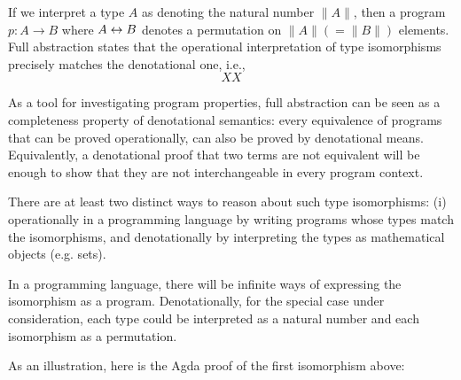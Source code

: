 If we interpret a type $A$ as denoting the natural number $\| A \|$, then a
program $p : A \rightarrow B$ where $A \leftrightarrow B$ denotes a permutation on
$\| A \| (= \| B \|)$ elements. Full abstraction states that the operational
interpretation of type isomorphisms precisely matches the denotational one,
i.e.,
\[
XX
\]

As a tool for investigating program properties, full abstraction can be seen as
a completeness property of denotational semantics: every equivalence of programs
that can be proved operationally, can also be proved by denotational
means. Equivalently, a denotational proof that two terms are not equivalent will
be enough to show that they are not interchangeable in every program context.

There are at least two distinct ways to reason about such type isomorphisms: (i)
operationally in a programming language by writing programs whose types match
the isomorphisms, and denotationally by interpreting the types as mathematical
objects (e.g. sets).

In a programming language, there will be infinite ways of
expressing the isomorphism as a program. Denotationally, for the special case
under consideration, each type could be interpreted as a natural number and each
isomorphism as a permutation.


As an illustration, here is the Agda proof of the first isomorphism above:




